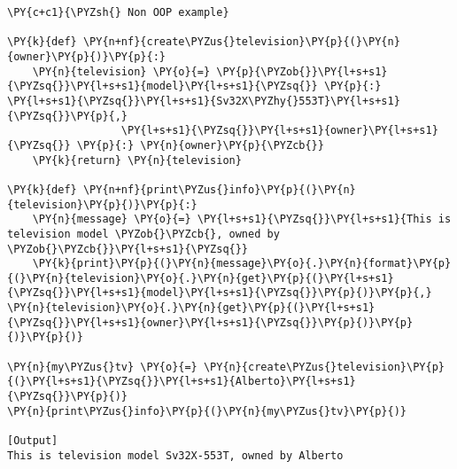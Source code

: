 \begin{Verbatim}[label=\makebox{\url{https://github.com/lucabaldini/cmepda/tree/master/slides/latex/snippets/non\_oop\_example.py}},commandchars=\\\{\}]
\PY{c+c1}{\PYZsh{} Non OOP example}

\PY{k}{def} \PY{n+nf}{create\PYZus{}television}\PY{p}{(}\PY{n}{owner}\PY{p}{)}\PY{p}{:}
    \PY{n}{television} \PY{o}{=} \PY{p}{\PYZob{}}\PY{l+s+s1}{\PYZsq{}}\PY{l+s+s1}{model}\PY{l+s+s1}{\PYZsq{}} \PY{p}{:} \PY{l+s+s1}{\PYZsq{}}\PY{l+s+s1}{Sv32X\PYZhy{}553T}\PY{l+s+s1}{\PYZsq{}}\PY{p}{,}
                  \PY{l+s+s1}{\PYZsq{}}\PY{l+s+s1}{owner}\PY{l+s+s1}{\PYZsq{}} \PY{p}{:} \PY{n}{owner}\PY{p}{\PYZcb{}}
    \PY{k}{return} \PY{n}{television}
                  
\PY{k}{def} \PY{n+nf}{print\PYZus{}info}\PY{p}{(}\PY{n}{television}\PY{p}{)}\PY{p}{:}
    \PY{n}{message} \PY{o}{=} \PY{l+s+s1}{\PYZsq{}}\PY{l+s+s1}{This is television model \PYZob{}\PYZcb{}, owned by \PYZob{}\PYZcb{}}\PY{l+s+s1}{\PYZsq{}}
    \PY{k}{print}\PY{p}{(}\PY{n}{message}\PY{o}{.}\PY{n}{format}\PY{p}{(}\PY{n}{television}\PY{o}{.}\PY{n}{get}\PY{p}{(}\PY{l+s+s1}{\PYZsq{}}\PY{l+s+s1}{model}\PY{l+s+s1}{\PYZsq{}}\PY{p}{)}\PY{p}{,} \PY{n}{television}\PY{o}{.}\PY{n}{get}\PY{p}{(}\PY{l+s+s1}{\PYZsq{}}\PY{l+s+s1}{owner}\PY{l+s+s1}{\PYZsq{}}\PY{p}{)}\PY{p}{)}\PY{p}{)}

\PY{n}{my\PYZus{}tv} \PY{o}{=} \PY{n}{create\PYZus{}television}\PY{p}{(}\PY{l+s+s1}{\PYZsq{}}\PY{l+s+s1}{Alberto}\PY{l+s+s1}{\PYZsq{}}\PY{p}{)}
\PY{n}{print\PYZus{}info}\PY{p}{(}\PY{n}{my\PYZus{}tv}\PY{p}{)}

[Output]
This is television model Sv32X-553T, owned by Alberto
\end{Verbatim}